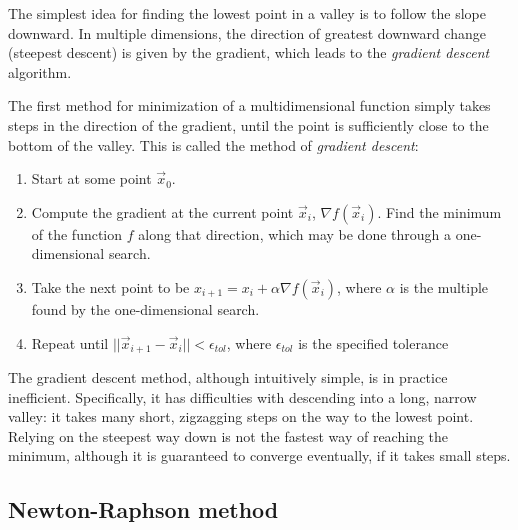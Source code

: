 \documentclass[
  letterpaper,
  DIV=11,
  numbers=noendperiod]{scrreprt}
\begin{document}
The simplest idea for finding the lowest point in a valley is to follow
the slope downward. In multiple dimensions, the direction of greatest
downward change (steepest descent) is given by the gradient, which leads
to the \emph{gradient descent} algorithm.

The first method for minimization of a multidimensional function simply
takes steps in the direction of the gradient, until the point is
sufficiently close to the bottom of the valley. This is called the
method of \emph{gradient descent}:

\begin{tcolorbox}[enhanced jigsaw, toptitle=1mm, colback=white, arc=.35mm, opacitybacktitle=0.6, colframe=quarto-callout-note-color-frame, left=2mm, leftrule=.75mm, rightrule=.15mm, breakable, opacityback=0, toprule=.15mm, titlerule=0mm, bottomtitle=1mm, title=\textcolor{quarto-callout-note-color}{\faInfo}\hspace{0.5em}{Gradient descent algorithm}, bottomrule=.15mm, colbacktitle=quarto-callout-note-color!10!white, coltitle=black]

\begin{enumerate}
\def\labelenumi{\arabic{enumi}.}
\item
  Start at some point \(\vec x_0\).
\item
  Compute the gradient at the current point \(\vec x_i\),
  \(\nabla f (\vec x_i)\). Find the minimum of the function \(f\) along
  that direction, which may be done through a one-dimensional search.
\item
  Take the next point to be
  \(x_{i+1} = x_i + \alpha \nabla f (\vec x_i)\), where \(\alpha\) is
  the multiple found by the one-dimensional search.
\item
  Repeat until \(|| \vec x_{i+1} - \vec x_i || < \epsilon_{tol}\), where
  \(\epsilon_{tol}\) is the specified tolerance
\end{enumerate}

\end{tcolorbox}

The gradient descent method, although intuitively simple, is in practice
inefficient. Specifically, it has difficulties with descending into a
long, narrow valley: it takes many short, zigzagging steps on the way to
the lowest point. Relying on the steepest way down is not the fastest
way of reaching the minimum, although it is guaranteed to converge
eventually, if it takes small steps.

\subsection{Newton-Raphson method}\label{newton-raphson-method-1}
\end{document}
